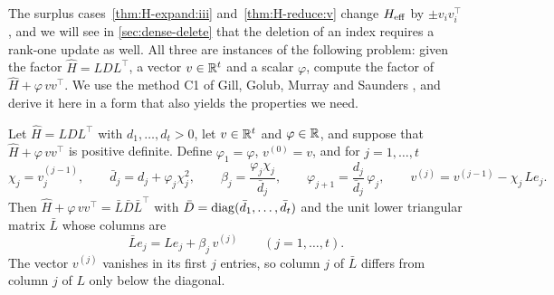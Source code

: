 The surplus cases~\ref{thm:H-expand:iii} and~\ref{thm:H-reduce:v} change $H_{\mathrm{eff}}$ by $\pm v_iv_i^\top$, and we will see in
\cref{sec:dense-delete} that the deletion of an index requires a rank-one update as well. All
three are instances of the following problem: given the factor $\hat H = LDL^\top$, a vector
$v\in\mathbb{R}^t$ and a scalar $\varphi$, compute the factor of $\hat H + \varphi\,vv^\top$. We use the
method C1 of Gill, Golub, Murray and Saunders \cite{gill1974methods}, and derive it here in a
form that also yields the properties we need.

\begin{theorem} \label{thm:rank-one}
Let $\hat H = LDL^\top$ with $d_1,\dots,d_t>0$, let $v\in\mathbb{R}^t$ and $\varphi\in\mathbb{R}$, and suppose that
$\hat H + \varphi\,vv^\top$ is positive definite. Define $\varphi_1 = \varphi$, $v^{(0)} = v$, and
for $j = 1,\dots,t$
\begin{equation} \label{eq:c1}
\chi_j = v^{(j-1)}_j,\qquad \bar d_j = d_j + \varphi_j\chi_j^2,\qquad
\beta_j = \frac{\varphi_j\chi_j}{\bar d_j},\qquad \varphi_{j+1} = \frac{d_j}{\bar d_j}\,\varphi_j,\qquad
v^{(j)} = v^{(j-1)} - \chi_j\,Le_j .
\end{equation}
Then $\hat H + \varphi\,vv^\top = \bar L\bar D\bar L^\top$ with $\bar D = \operatorname{diag}(\bar d_1,\dots,\bar d_t)$ and the
unit lower triangular matrix $\bar L$ whose columns are
\[
\bar Le_j = Le_j + \beta_j\,v^{(j)}\qquad(j = 1,\dots,t).
\]
The vector $v^{(j)}$ vanishes in its first $j$ entries, so column $j$ of $\bar L$ differs from
column $j$ of $L$ only below the diagonal.
\end{theorem}

